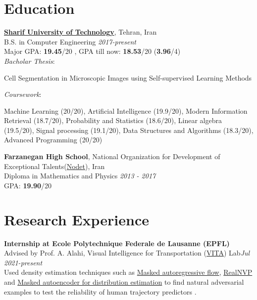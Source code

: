 \documentclass[11pt,line,margin]{resume}
\begin{document}
\begin{resume}
\section{\sc Education}
\begin{list1}
\item[] {\bf \href{http://www.sharif.ir/home}{Sharif University of Technology}}, Tehran, Iran\\
B.S. in Computer Engineering  \hfill\textit{2017-present}\\
Major GPA: {\bf 19.45}/20 , GPA till now: {\bf 18.53}/20  ({\bf 3.96}/4)\\ 
\textit{Bacholar Thesis}:
\par \setlength{\leftskip}{1cm} Cell Segmentation in Microscopic Images using Self-supervised Learning Methods 
\\
\par
\setlength{\leftskip}{0pt}
\textit{Coursework}: 
\par \setlength{\leftskip}{1cm}Machine Learning (20/20), Artificial Intelligence (19.9/20), Modern Information Retrieval (18.7/20), Probability and Statistics (18.6/20), Linear algebra (19.5/20), Signal processing (19.1/20), Data Structures and Algorithms (18.3/20), Advanced Programming (20/20)
\\
\par
\setlength{\leftskip}{0pt}

\item[] \textbf{Farzanegan High School}, National Organization for Development of Exceptional Talents(\href{https://en.wikipedia.org/wiki/National_Organization_for_Development_of_Exceptional_Talents}{Nodet}), Iran\\
Diploma in Mathematics and Physics  \hfill\textit{2013 - 2017}\\
GPA: {\bf 19.90}/20
\end{list1}

\vspace{-0.13in}
\section{\sc Research Experience}

\begin{list1}
\item[] \textbf{Internship at Ecole Polytechnique Federale de Lausanne (EPFL)} \\
Advised by Prof. A. Alahi, Visual Intelligence for Transportation (\href{https://www.epfl.ch/labs/vita/}{VITA}) Lab\hfill \textit{Jul 2021-present}\\ 
Used density estimation techniques such as \href{https://arxiv.org/abs/1705.07057}{Masked autoregressive flow}, \href{https://arxiv.org/abs/1605.08803}{RealNVP} and \href{https://arxiv.org/abs/1502.03509}{Masked autoencoder for distribution estimation} to find natural adversarial examples to test the reliability of human trajectory predictors .\\


\end{list1}
\end{resume}
\end{document}
